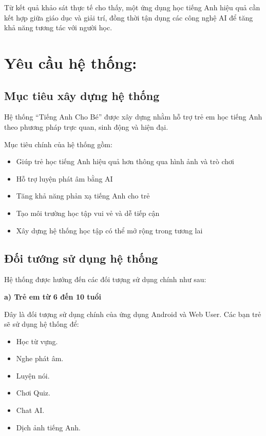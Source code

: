 Từ kết quả khảo sát thực tế cho thấy, một ứng dụng học tiếng Anh hiệu quả cần kết hợp giữa giáo dục và giải trí, đồng thời tận dụng các công nghệ AI để tăng khả năng tương tác với người học.


\section{Yêu cầu hệ thống:}

\subsection{Mục tiêu xây dựng hệ thống}

Hệ thống ``Tiếng Anh Cho Bé'' được xây dựng nhằm hỗ trợ trẻ em học tiếng Anh theo phương pháp trực quan, sinh động và hiện đại.


Mục tiêu chính của hệ thống gồm:


\begin{itemize}
\item Giúp trẻ học tiếng Anh hiệu quả hơn thông qua hình ảnh và trò chơi
\item Hỗ trợ luyện phát âm bằng AI
\item Tăng khả năng phản xạ tiếng Anh cho trẻ
\item Tạo môi trường học tập vui vẻ và dễ tiếp cận
\item Xây dựng hệ thống học tập có thể mở rộng trong tương lai
\end{itemize}

\subsection{Đối tướng sử dụng hệ thống}

Hệ thống được hướng đến các đối tượng sử dụng chính như sau:


\noindent\textbf{a) Trẻ em từ 6 đến 10 tuổi}


Đây là đối tượng sử dụng chính của ứng dụng Android và Web User. Các bạn trẻ sẽ sử dụng hệ thống để:


\begin{itemize}[leftmargin=1.3cm,itemsep=0.3cm]
	\item Học từ vựng.
	\item Nghe phát âm.
	\item Luyện nói.
	\item Chơi Quiz.
	\item Chat AI.
	\item Dịch ảnh tiếng Anh.
\end{itemize}


